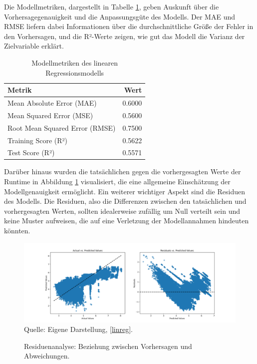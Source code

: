 Die Modellmetriken, dargestellt in Tabelle \ref{tab:model-metrics}, 
geben Auskunft über die Vorhersagegenauigkeit und die Anpassungsgüte des Modells. 
Der MAE und RMSE liefern dabei Informationen über die durchschnittliche Größe 
der Fehler in den Vorhersagen, und die R²-Werte zeigen, wie gut das Modell die Varianz 
der Zielvariable erklärt.

\begin{table}[!h]
    \centering
    \caption{Modellmetriken des linearen Regressionsmodells}
    \begin{tabularx}{\textwidth}{Xr}
    \toprule
    Metrik & Wert \\
    \midrule
    Mean Absolute Error (MAE) & 0.6000 \\
    Mean Squared Error (MSE) & 0.5600 \\
    Root Mean Squared Error (RMSE) & 0.7500 \\
    Training Score (R²) & 0.5622 \\
    Test Score (R²) & 0.5571 \\
    \bottomrule
    \end{tabularx}
    \label{tab:model-metrics}
\end{table}

Darüber hinaus wurden die tatsächlichen gegen die vorhergesagten Werte der Runtime
in Abbildung \ref{pic:residuals} visualisiert, die eine allgemeine Einschätzung der 
Modellgenauigkeit ermöglicht. Ein weiterer wichtiger Aspekt sind die Residuen des Modells. 
Die Residuen, also die Differenzen zwischen den tatsächlichen und vorhergesagten Werten, 
sollten idealerweise zufällig um Null verteilt sein und keine Muster aufweisen, 
die auf eine Verletzung der Modellannahmen hindeuten könnten.

\begin{figure}[!h]
    \caption{Residuenanalyse: Beziehung zwischen Vorhersagen und Abweichungen.}
    \includegraphics[width=1\textwidth]{../scripts/images/residuals_gpu.png}
    Quelle: Eigene Darstellung, \ref{linreg}.
    \label{pic:residuals}
\end{figure}

